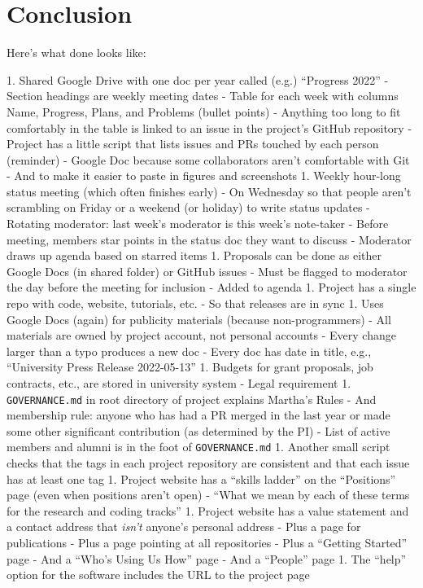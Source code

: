 \documentclass[10pt,letterpaper]{article}
\begin{document}
\section*{Conclusion}

Here's what done looks like:

1.  Shared Google Drive with one doc per year called (e.g.) ``Progress 2022''
    - Section headings are weekly meeting dates
      - Table for each week with columns Name, Progress, Plans, and Problems (bullet points)
      - Anything too long to fit comfortably in the table is linked to an issue in the project's GitHub repository
      - Project has a little script that lists issues and PRs touched by each person (reminder)
    - Google Doc because some collaborators aren't comfortable with Git
      - And to make it easier to paste in figures and screenshots
1.  Weekly hour-long status meeting (which often finishes early)
    - On Wednesday so that people aren't scrambling on Friday or a weekend (or holiday) to write status updates
    - Rotating moderator: last week's moderator is this week's note-taker
    - Before meeting, members star points in the status doc they want to discuss
    - Moderator draws up agenda based on starred items
1.  Proposals can be done as either Google Docs (in shared folder) or GitHub issues
    - Must be flagged to moderator the day before the meeting for inclusion
    - Added to agenda
1.  Project has a single repo with code, website, tutorials, etc.
    - So that releases are in sync
1.  Uses Google Docs (again) for publicity materials (because non-programmers)
    - All materials are owned by project account, not personal accounts
    - Every change larger than a typo produces a new doc
    - Every doc has date in title, e.g., ``University Press Release 2022-05-13''
1.  Budgets for grant proposals, job contracts, etc., are stored in university system
    - Legal requirement
1.  \texttt{GOVERNANCE.md} in root directory of project explains Martha's Rules
    - And membership rule: anyone who has had a PR merged in the last year or made some other significant contribution (as determined by the PI)
    - List of active members and alumni is in the foot of \texttt{GOVERNANCE.md}
1.  Another small script checks that the tags in each project repository are consistent and that each issue has at least one tag
1.  Project website has a ``skills ladder'' on the ``Positions'' page (even when positions aren't open)
    - ``What we mean by each of these terms for the research and coding tracks''
1.  Project website has a value statement and a contact address that \emph{isn't} anyone's personal address
    - Plus a page for publications
    - Plus a page pointing at all repositories
    - Plus a ``Getting Started'' page
    - And a ``Who's Using Us How'' page
    - And a ``People'' page
1.  The ``help'' option for the software includes the URL to the project page
\end{document}
